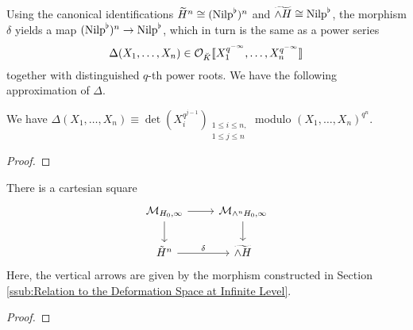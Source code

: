 \documentclass[../main.tex]{subfiles}
\begin{document}
Using the canonical identifications $\widetilde{H}^n \cong ({\mathrm{Nilp}}^\flat)^n$
and $\widetilde{\wedge H} \cong {\mathrm{Nilp}}^\flat$, the morphism $\delta$ yields a 
map $({\mathrm{Nilp}}^\flat)^n \to {\mathrm{Nilp}}^\flat$, which in turn is the same as a power series 
\begin{equation*}
  \Delta(X_1, \dots, X_n) \in \mathcal{O}_{\breve K}\llbracket X_1^{q^{-\infty}}, \dots,
  X_n^{q^{-\infty}}\rrbracket
\end{equation*}
together with distinguished $q$-th power roots. 
We have the following approximation of $\Delta$. 
\begin{lem}\label{lem:DeltaApprox}
  We have $\Delta(X_1, \dots, X_n) \equiv \det(X_i^{q^{j-1}})_{\substack{1 \leq i \leq n,\\ 1 \leq j \leq n}}$ modulo $(X_1, \dots, X_n)^{q^n}$.
\begin{proof}
\end{proof}
\end{lem}

\begin{thm}[]\label{thm:}
  There is a cartesian square
\begin{equation*}
\begin{tikzcd}[ampersand replacement=\&]
	{\cM_{H_0, \infty}} \& {\cM_{\wedge^n H_0, \infty}} \\
	{\tilde H^n} \& {\widetilde{\wedge H}}
	\arrow[from=1-1, to=1-2]
	\arrow[from=1-1, to=2-1]
	\arrow[from=1-2, to=2-2]
	\arrow["\delta", from=2-1, to=2-2]
\end{tikzcd}
\end{equation*}
Here, the vertical arrows are given by the morphism constructed in 
Section \ref{ssub:Relation to the Deformation Space at Infinite Level}. 
\begin{proof}
\end{proof}
\end{thm}



\end{document}
